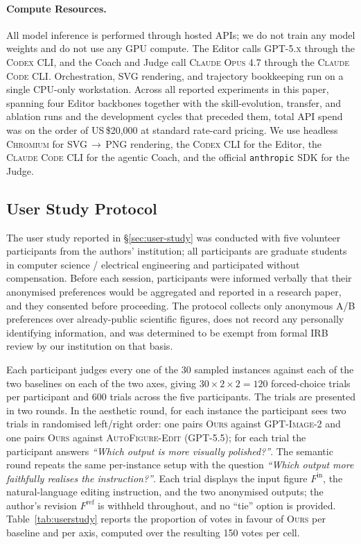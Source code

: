 \documentclass[11pt]{article}
\begin{document}
\paragraph{Compute Resources.}
All model inference is performed through hosted APIs; we do
not train any model weights and do not use any GPU compute.
The Editor calls \textsc{GPT-5.x} through the \textsc{Codex}
CLI, and the Coach and Judge call \textsc{Claude Opus 4.7}
through the \textsc{Claude Code} CLI.  Orchestration, SVG
rendering, and trajectory bookkeeping run on a single
CPU-only workstation.  Across all reported experiments in
this paper, spanning four Editor backbones together with the
skill-evolution, transfer, and ablation runs and the
development cycles that preceded them, total API spend was on
the order of US\,\$20{,}000 at standard rate-card pricing.  We use
headless \textsc{Chromium} for SVG\,$\to$\,PNG rendering, the
\textsc{Codex} CLI for the Editor, the \textsc{Claude Code}
CLI for the agentic Coach, and the official \texttt{anthropic}
SDK for the Judge.

\subsection{User Study Protocol}
\label{sec:appendix-userstudy}

The user study reported in \S\ref{sec:user-study} was
conducted with five volunteer participants from the authors'
institution; all participants are graduate students in
computer science / electrical engineering and participated
without compensation.  Before each session, participants were
informed verbally that their anonymised preferences would be
aggregated and reported in a research paper, and they
consented before proceeding.  The protocol collects only
anonymous A/B preferences over already-public scientific
figures, does not record any personally identifying
information, and was determined to be exempt from formal IRB
review by our institution on that basis.

Each participant judges every one of the 30 sampled instances
against each of the two baselines on each of the two axes,
giving $30 \times 2 \times 2 = 120$ forced-choice trials per
participant and 600 trials across the five participants.  The
trials are presented in two rounds.  In the aesthetic round,
for each instance the participant sees two trials in
randomised left/right order: one pairs \textsc{Ours} against
\textsc{GPT-Image-2} and one pairs \textsc{Ours} against
\textsc{AutoFigure-Edit} (\textsc{GPT-5.5}); for each trial
the participant answers \emph{``Which output is more visually
polished?''}.  The semantic round repeats the same
per-instance setup with the question \emph{``Which output
more faithfully realises the instruction?''}.  Each trial
displays the input figure $F^{\mathrm{in}}$, the
natural-language editing instruction, and the two anonymised
outputs; the author's revision $F^{\mathrm{ref}}$ is withheld
throughout, and no ``tie'' option is provided.
Table~\ref{tab:userstudy} reports the proportion of votes in
favour of \textsc{Ours} per baseline and per axis, computed
over the resulting 150 votes per cell.
\end{document}
